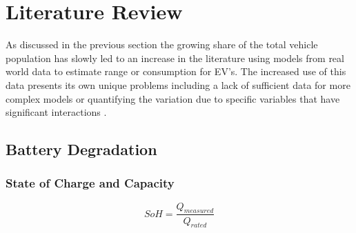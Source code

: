 \documentclass{article}
\begin{document}
\section{Literature Review}

As discussed in the previous section the growing share of the total vehicle population has slowly led to an increase in the literature using models from real world data to estimate range or consumption for EV's. The increased use of this data presents its own unique problems including a lack of sufficient data for more complex models \citep{Yang2017} or quantifying the variation due to specific variables that have significant interactions \citep{Liu2018}. 


\subsection{Battery Degradation}

\subsubsection{State of Charge and Capacity}

 
\begin{equation}\label{eq:1}
    SoH = \frac{Q_{measured}}{Q_{rated}}
\end{equation}
\end{document}
